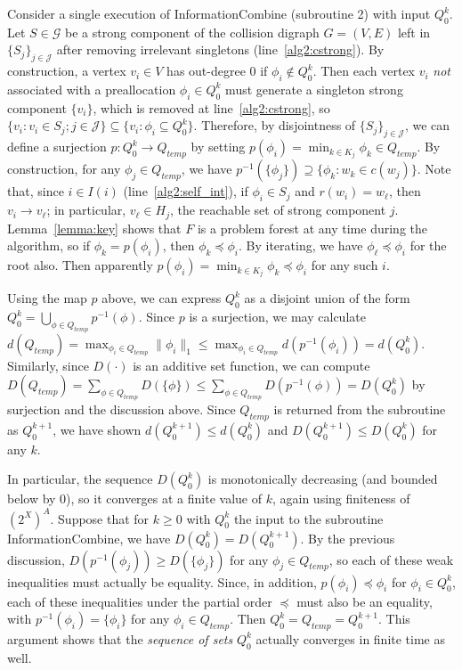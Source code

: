 \documentclass[11pt,reqno]{amsart}
\theoremstyle{definition}
\numberwithin{equation}{section}
\newcommand{\inv}{^{-1}}
\newcommand{\pre}{\phi}
\newcommand{\prealloc}{(2^X)^A}
\newcommand{\sub}{\subseteq}
\newcommand{\peq}{\preceq}
\newcommand{\strongc}{\mathcal{G}}
\newcommand{\strongcomp}{S}
\newcommand{\acto}{Q_0}
\newcommand{\actok}{Q_0^k}
\newcommand{\actt}{Q_{temp}}
\newcommand{\disto}{d}
\newcommand{\distt}{D}
\newcommand{\coll}{I}
\newcommand{\reach}{H}
\newcommand{\forest}{F}
\begin{document}
Consider a single execution of InformationCombine (subroutine 2) with input $\actok$.
Let $\strongcomp \in \strongc$ be a strong component of the collision digraph $G = (V,E)$ left in $\{\strongcomp_j\}_{j \in \mathcal{J}}$ after removing irrelevant singletons (line~\ref{alg2:cstrong}).
By construction, a vertex $v_i \in V$ has out-degree $0$ if $\pre_i \not \in \actok$.
Then each vertex $v_i$ \emph{not} associated with a preallocation $\pre_i \in \actok$ must generate a singleton strong component $\{v_i\}$, which is removed at line~\ref{alg2:cstrong}, so $\{v_i: v_i \in \strongcomp_j; j \in \mathcal{J}\} \sub \{v_i: \pre_i \sub \actok\}$. 
Therefore, by disjointness of $\{\strongcomp_j\}_{j \in \mathcal{J}}$, we can define a surjection $p: \actok \to \actt$ by setting $p(\pre_i) = \min_{k \in K_j} \pre_k \in \actt$. 
By construction, for any $\pre_j \in \actt$, we have $p\inv(\{\pre_j\}) \supseteq \{\pre_k: w_k \in c(w_j)\}$. 
Note that, since $i \in \coll(i)$ (line~\ref{alg2:self_int}), if $\pre_i \in \strongcomp_j$ and $r(w_i) = w_{\ell}$, then $v_i \to v_{\ell}$; in particular, $v_{\ell} \in \reach_j$, the reachable set of strong component $j$.
Lemma~\ref{lemma:key} shows that $\forest$ is a problem forest at any time during the algorithm, so if $\pre_k = p(\pre_i)$, then $\pre_k \peq \pre_i$.
By iterating, we have $\pre_{\ell} \peq \pre_i$ for the root also.
Then apparently $p(\pre_i) = \min_{k \in K_j} \pre_k \peq \pre_i$ for any such $i$. 

Using the map $p$ above, we can express $\actok$ as a disjoint union of the form $\actok = \bigcup_{\pre \in \actt} p\inv(\pre)$.
Since $p$ is a surjection, we may calculate $\disto(\actt) = \max_{\pre_i \in \actt} \|\pre_i\|_1 \leq \max_{\pre_i \in \actt} \disto(p\inv(\pre_i)) = \disto(\actok)$. 
Similarly, since $\distt(\cdot)$ is an additive set function, we can compute $\distt(\actt) = \sum_{\pre \in \actt} \distt(\{\pre\}) \leq \sum_{\pre \in \actt} \distt(p\inv(\pre)) = \distt(\actok)$ by surjection and the discussion above.
Since $\actt$ is returned from the subroutine as $\acto^{k + 1}$, we have shown $\disto(\acto^{k+1}) \leq \disto(\actok)$ and $\distt(\acto^{k+1}) \leq \distt(\actok)$ for any $k$. 

In particular, the sequence $\distt(\actok)$ is monotonically decreasing (and bounded below by 0), so it converges at a finite value of $k$, again using finiteness of $\prealloc$. 
Suppose that for $k \geq 0$ with $\actok$ the input to the subroutine InformationCombine, we have $\distt(\actok) = \distt(\acto^{k+1})$.
By the previous discussion, $\distt(p\inv(\pre_j)) \geq \distt(\{\pre_j\})$ for any $\pre_j \in \actt$, so each of these weak inequalities must actually be equality. 
Since, in addition, $p(\pre_i) \peq \pre_i$ for $\pre_i \in \actok$, each of these inequalities under the partial order $\peq$ must also be an equality, with $p\inv(\pre_i) = \{\pre_i\}$ for any $\pre_i \in \actt$.
Then $\actok = \actt = \acto^{k+1}$. 
This argument shows that the \emph{sequence of sets} $\actok$ actually converges in finite time as well. 
\end{document}
